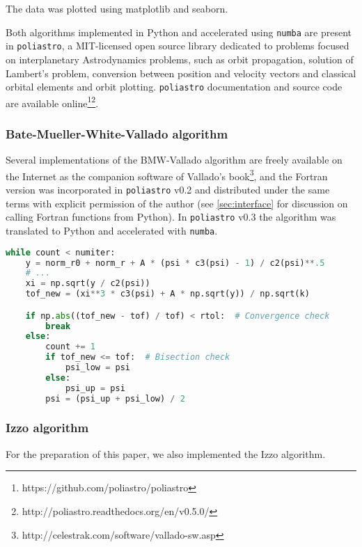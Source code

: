 The data was plotted using matplotlib and seaborn\cite{Droettboom2016}\cite{Waskom2014}.


Both algorithms implemented in Python and accelerated using \verb|numba| are present in \verb|poliastro|, a MIT-licensed open source library dedicated to problems focused on interplanetary Astrodynamics problems, such as orbit propagation, solution of Lambert's problem, conversion between position and velocity vectors and classical orbital elements and orbit plotting. \verb|poliastro| documentation and source code are available online\footnote{https://github.com/poliastro/poliastro}\footnote{http://poliastro.readthedocs.org/en/v0.5.0/}.

\subsubsection{Bate-Mueller-White-Vallado algorithm}

Several implementations of the BMW-Vallado algorithm are freely available on the Internet as the companion software of Vallado's book\footnote{http://celestrak.com/software/vallado-sw.asp}, and the Fortran version was incorporated in \verb|poliastro| v0.2 and distributed under the same terms with explicit permission of the author (see \ref{sec:interface} for discussion on calling Fortran functions from Python). In \verb|poliastro| v0.3 the algorithm was translated to Python and accelerated with \verb|numba|.

\begin{lstlisting}[language=Python]
while count < numiter:
    y = norm_r0 + norm_r + A * (psi * c3(psi) - 1) / c2(psi)**.5
    # ...
    xi = np.sqrt(y / c2(psi))
    tof_new = (xi**3 * c3(psi) + A * np.sqrt(y)) / np.sqrt(k)

    if np.abs((tof_new - tof) / tof) < rtol:  # Convergence check
        break
    else:
        count += 1
        if tof_new <= tof:  # Bisection check
            psi_low = psi
        else:
            psi_up = psi
        psi = (psi_up + psi_low) / 2
\end{lstlisting}


\subsubsection{Izzo algorithm}

For the preparation of this paper, we also implemented the Izzo algorithm.

